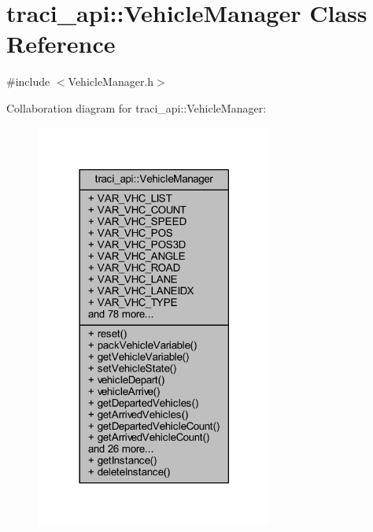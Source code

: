 \hypertarget{classtraci__api_1_1_vehicle_manager}{}\section{traci\+\_\+api\+:\+:Vehicle\+Manager Class Reference}
\label{classtraci__api_1_1_vehicle_manager}


{\ttfamily \#include $<$Vehicle\+Manager.\+h$>$}



Collaboration diagram for traci\+\_\+api\+:\+:Vehicle\+Manager\+:
\nopagebreak
\begin{figure}[H]
\begin{center}
\leavevmode
\includegraphics[width=222pt]{classtraci__api_1_1_vehicle_manager__coll__graph}
\end{center}
\end{figure}

